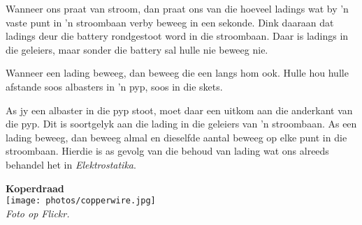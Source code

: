 Wanneer ons praat van stroom, dan praat ons van die hoeveel ladings wat by 'n vaste punt
in 'n stroombaan verby beweeg in een sekonde. Dink daaraan dat ladings deur die
battery rondgestoot word in die stroombaan. Daar is ladings in die geleiers,
maar sonder die battery sal hulle nie beweeg nie.\\
\begin{minipage}{.5\textwidth}
Wanneer een lading beweeg, dan beweeg die een langs hom ook. Hulle hou hulle
afstande soos albasters in 'n pyp, soos in die skets.
\begin{center}
\end{center}
As jy een albaster in die pyp stoot, moet daar een uitkom aan die anderkant van
die pyp. Dit is soortgelyk aan die lading in die geleiers van 'n stroombaan. As
een lading beweeg, dan beweeg almal en dieselfde aantal beweeg op elke punt in
die stroombaan. Hierdie is as gevolg van die behoud van lading wat ons alreeds
behandel het in \textsl{Elektrostatika}.
 \end{minipage}
\begin{minipage}{.5\textwidth}
\begin{center}
\textbf{Koperdraad}\\
\texttt{[image: photos/copperwire.jpg]}\\
\textit{Foto op Flickr.}
\end{center}  
\end{minipage}
